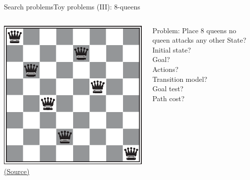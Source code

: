 \documentclass[10pt,compress]{beamer} %
\begin{document}
\begin{frame}{Search problems}{Toy problems (III): 8-queens}
       \begin{columns}
	            \centering \includegraphics[width=\linewidth]{figs/8queens.eps}\\
	            \tiny{\href{http://aima.cs.berkeley.edu/index.html}{(Source)}}
                \begin{exampleblock}{Problem: Place 8 queens no queen attacks any other}
                State?\\
                Initial state? \\
                Goal? \\
                Actions? \\ 
                Transition model? \\
                Goal test? \\
                Path cost?\\
                \end{exampleblock}
      \end{columns}
\end{frame}
\end{document}

